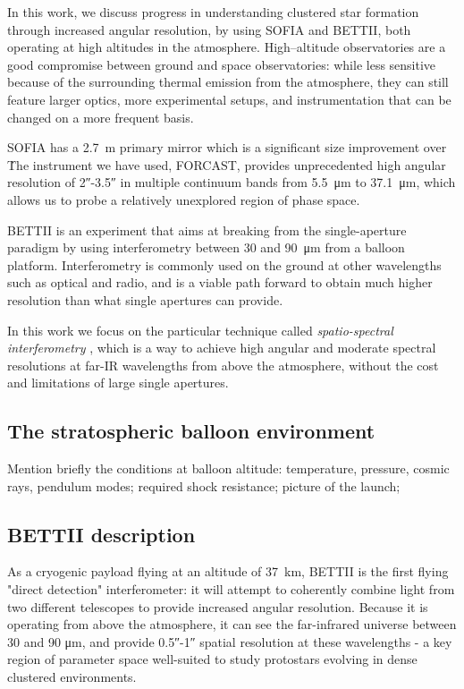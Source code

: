 In this work, we discuss progress in understanding clustered star formation through increased angular resolution, by using SOFIA and BETTII, both operating at high altitudes in the atmosphere. High--altitude observatories are a good compromise between ground and space observatories: while less sensitive because of the surrounding thermal emission from the atmosphere, they can still feature larger optics, more experimental setups, and instrumentation that can be changed on a more frequent basis.

SOFIA has a \SI{2.7}{\meter} primary mirror which is a significant size improvement over \Spitzer\. The instrument we have used, FORCAST, provides unprecedented high angular resolution of \ang{;;2}-\ang{;;3.5} in multiple continuum bands from \SI{5.5}{\micro\meter} to \SI{37.1}{\micro\meter}, which allows us to probe a relatively unexplored region of phase space.

BETTII is an experiment that aims at breaking from the single-aperture paradigm by using interferometry between 30 and \SI{90}{\micro\meter} from a balloon platform. Interferometry is commonly used on the ground at other wavelengths such as optical and radio, and is a viable path forward to obtain much higher resolution than what single apertures can provide. 

In this work we focus on the particular technique called \textit{spatio-spectral interferometry} \citep{Mariotti:1988vea}, which is a way to achieve 
high angular and moderate spectral resolutions at far-IR wavelengths from above the atmosphere, without the cost and limitations of large single apertures. 


\subsection{The stratospheric balloon environment}

Mention briefly the conditions at balloon altitude: temperature, pressure, cosmic rays, pendulum modes; required shock resistance; picture of the launch; 


\subsection{BETTII description}

As a cryogenic payload flying at an altitude of \SI{37}{\kilo\meter}, BETTII is the first flying "direct detection" interferometer: it will attempt to coherently combine light from two different telescopes to provide increased angular resolution. Because it is operating from above the atmosphere, it can see the far-infrared universe between 30 and 90 \si{\micro\meter}, and provide \ang{;;0.5}-\ang{;;1} spatial resolution at these wavelengths - a key region of parameter space well-suited to study protostars evolving in dense clustered environments.

